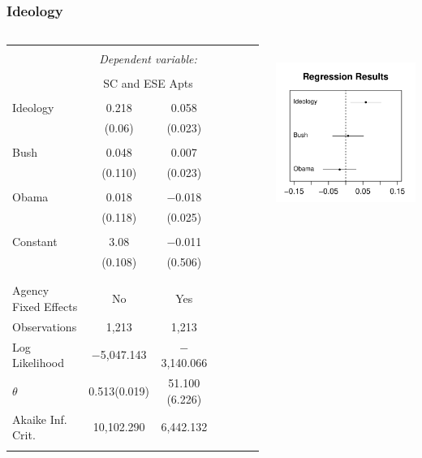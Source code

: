 \documentclass{beamer}
\begin{document}
\begin{frame}[fragile]
\frametitle{Ideology}
\begin{columns}[T] %
\begin{column}{.48\textwidth}
\begin{center}
\begin{table}[!htb] \centering 
\tiny 
  \label{} 
\begin{tabular}{@{\extracolsep{1pt}}lcccccc} 
\\[-1.8ex]\hline 
\hline \\[-1.8ex] 
 & \multicolumn{2}{c}{\textit{Dependent variable:}} \\ 
\cline{2-3} 
\\[-1.8ex] & \multicolumn{2}{c}{SC and ESE Apts} \\ 
\hline \\[-1.8ex] 
 Ideology & 0.218 & 0.058 \\ 
  & (0.06) & (0.023) \\ 
  & &\\ 
 Bush & 0.048 & 0.007 \\ 
  & (0.110) & (0.023) \\ 
  & &\\ 
 Obama & 0.018 & $-$0.018 \\ 
  & (0.118) & (0.025) \\ 
  & &\\ 
 Constant & 3.08& $-$0.011 \\ 
  & (0.108)& (0.506) \\ 
  & &\\ 
\hline \\[-1.8ex] 
Agency Fixed Effects & No & Yes \\
Observations & 1,213 & 1,213\\ 
Log Likelihood & $-$5,047.143 & $-$3,140.066 \\ 
$\theta$ & 0.513(0.019)& 51.100 (6.226) \\ 
Akaike Inf. Crit. & 10,102.290 & 6,442.132& \\ 
\hline 
\hline \\[-1.8ex] 
\end{tabular} 
\end{table} 
\end{center}
\end{column}
\begin{column}{.48\textwidth}
\begin{center}
\includegraphics[height=2.25in,width=2.25in]{RegressionResults.pdf}
\end{center}
\end{column}
\end{columns}
\end{frame}
\end{document}
